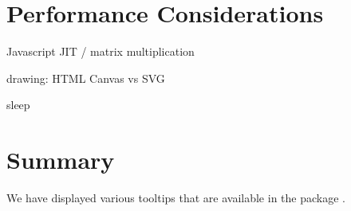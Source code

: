 \hypertarget{performance-considerations}{%
\section{Performance Considerations}\label{performance-considerations}}

Javascript JIT / matrix multiplication

drawing: HTML Canvas vs SVG

sleep

\hypertarget{summary}{%
\section{Summary}\label{summary}}

We have displayed various tooltips that are available in the package
.



\address{%
Casper Hart\\
University of Auckland\\%
Department of Statistics\\
%
%
%
\href{mailto:casperhart93@gmail.com}{\nolinkurl{casperhart93@gmail.com}}%
}

\address{%
Earo Wang\\
University of Auckland\\%
Department of Statistics\\
%
%
%
\href{mailto:earo.wang@auckland.ac.nz}{\nolinkurl{earo.wang@auckland.ac.nz}}%
}
